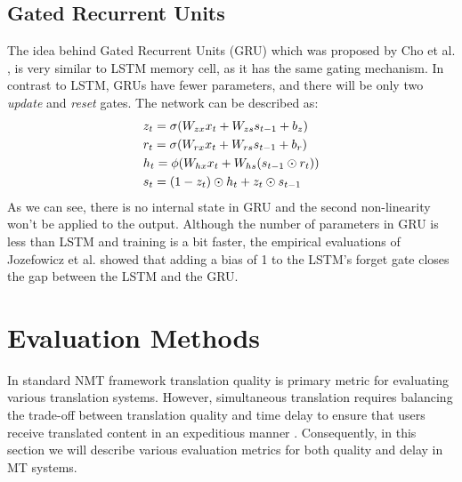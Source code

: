 \documentclass{sfuthesis}
\begin{document}
\subsection{Gated Recurrent Units}

The idea behind Gated Recurrent Units (GRU) which was proposed by Cho et al. \cite{cho:2014:arxive}, is very similar to LSTM memory cell, as it has the same gating mechanism. In contrast to LSTM, GRUs have fewer parameters, and there will be only two \textit{update} and \textit{reset} gates. The network can be described as:
\begin{align}
\centering
&z_t = \sigma (W_{zx}x_t + W_{zs}s_{t-1} + b_z) \label{eq:1.7}\\
&r_t = \sigma (W_{rx}x_t + W_{rs}s_{t-1} + b_r) \label{eq:1.8}\\
&h_t = \phi (W_{hx}x_t + W_{hs}(s_{t-1} \odot r_t )) \label{eq:1.9}\\ 
&s_t = (1 - z_t) \odot h_t + z_{t} \odot s_{t-1} \label{eq:1.10}
\end{align}
As we can see, there is no internal state in GRU and the second non-linearity won't be applied to the output. Although the number of parameters in GRU is less than LSTM and training is a bit faster, the empirical evaluations of Jozefowicz et al. \cite{Jozefowicz:2015:ICML} showed that adding a bias of 1 to the LSTM's forget gate closes the gap between the LSTM and the GRU.


\section{Evaluation Methods}
In standard NMT framework translation quality is primary metric for evaluating various translation systems. However, simultaneous translation requires balancing the trade-off between translation quality and time delay to ensure that users receive translated content in an expeditious manner \cite{mieno:2015:interspeech}. Consequently, in this section we will describe various evaluation metrics for both quality and delay in MT systems.
\end{document}
